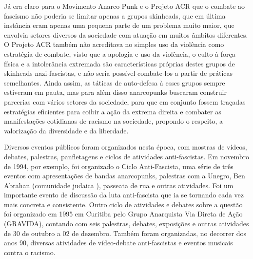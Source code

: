 Já era claro para o Movimento Anarco Punk e o Projeto ACR que o combate ao fascismo não poderia se limitar apenas a grupos skinheads, que em última instância eram apenas uma pequena parte de um problema muito maior, que envolvia setores diversos da sociedade com atuação em muitos âmbitos diferentes. O Projeto ACR também não acreditava no simples uso da violência como estratégia de combate, visto que a apologia e uso da violência, o culto à força física e a intolerância extremada são características próprias destes grupos de skinheads nazi-fascistas, e não seria possível combate-los a partir de práticas semelhantes. Ainda assim, as táticas de auto-defesa à esses grupos sempre estiveram em pauta, mas para além disso anarcopunks buscaram construir parcerias com vários setores da sociedade, para que em conjunto fossem traçadas estratégias eficientes para coibir a ação da extrema direita e combater as manifestações cotidianas de racismo na sociedade, propondo o respeito, a valorização da diversidade e da liberdade.

Diversos eventos públicos foram organizados nesta época, com mostras de vídeos, debates, palestras, panfletagens e ciclos de atividades anti-fascistas. Em novembro de 1994, por exemplo, foi organizado o Ciclo Anti-Fascista, uma série de três eventos com apresentações de bandas anarcopunks, palestras com a Unegro, Ben Abrahan (comunidade judaica ), passeata de rua e outras atividades. Foi um importante evento de discussão da luta anti-fascista que ia se tornando cada vez mais concreta e consistente.  Outro ciclo de atividades e debates sobre a questão foi organizado em 1995 em Curitiba pelo Grupo Anarquista Via Direta de Ação (GRAVIDA), contando com seis palestras, debates, exposições e outras atividades de 30 de outubro a 02 de dezembro. Também foram organizadas, no decorrer dos anos 90, diversas atividades de vídeo-debate anti-fascistas e eventos musicais contra o racismo.

